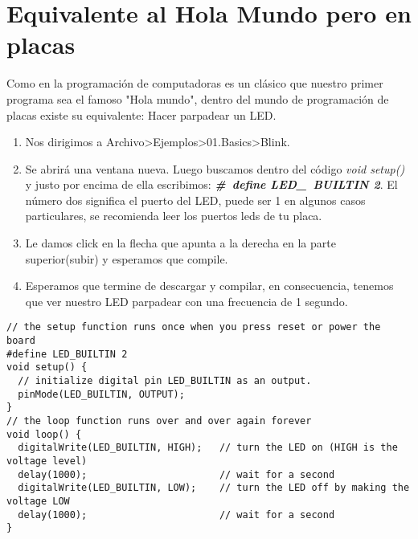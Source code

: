\documentclass[
	12pt, %
	fleqn, %
	a4paper, %
	oneside, %
]{LegrandOrangeBook}
\begin{document}
\section{Equivalente al Hola Mundo pero en placas}
Como en la programación de computadoras es un clásico que nuestro primer programa sea el famoso "Hola mundo", dentro del mundo de programación de placas existe su equivalente: Hacer parpadear un LED.
\begin{enumerate}
\item Nos dirigimos a Archivo>Ejemplos>01.Basics>Blink.
\item Se abrirá una ventana nueva. Luego buscamos dentro del código \textit{void setup()} y justo por encima de ella escribimos: \textit{\textbf{\#\ define LED\_\ BUILTIN 2}}. El número dos significa el puerto del LED, puede ser 1 en algunos casos particulares, se recomienda leer los puertos leds de tu placa.
\item Le damos click en la flecha que apunta a la derecha en la parte superior(subir) y esperamos que compile.
\item Esperamos que termine de descargar y compilar, en consecuencia, tenemos que ver nuestro LED parpadear con una frecuencia de 1 segundo.
\end{enumerate}
\begin{lstlisting}[language=Arduino,caption={Blink Program}]
// the setup function runs once when you press reset or power the board
#define LED_BUILTIN 2
void setup() {
  // initialize digital pin LED_BUILTIN as an output.
  pinMode(LED_BUILTIN, OUTPUT);
}
// the loop function runs over and over again forever
void loop() {
  digitalWrite(LED_BUILTIN, HIGH);   // turn the LED on (HIGH is the voltage level)
  delay(1000);                       // wait for a second
  digitalWrite(LED_BUILTIN, LOW);    // turn the LED off by making the voltage LOW
  delay(1000);                       // wait for a second
}
\end{lstlisting}
\end{document}

